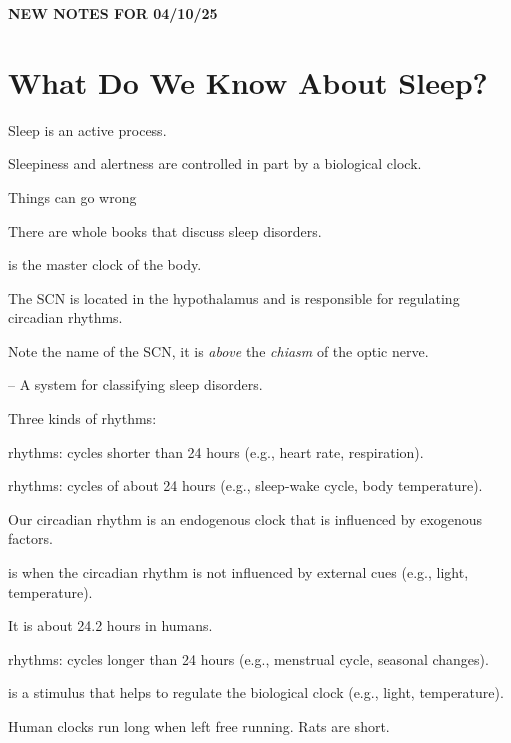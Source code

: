 \begin{center}
    \textbf{NEW NOTES FOR 04/10/25} \\
    \hrulefill
\end{center}

\section{What Do We Know About Sleep?}

\begin{coloredlist}
    \item Sleep is an active process.
    \item Sleepiness and alertness are controlled in part by a biological clock.
    \item Things can go wrong
    \begin{coloredlist}
        \item There are whole books that discuss sleep disorders.
    \end{coloredlist}
    \item {} is the master clock of the body.
    \begin{coloredlist}
        \item The SCN is located in the hypothalamus and is responsible for regulating circadian rhythms.
        \item Note the name of the SCN, it is \textit{above} the \textit{chiasm} of the optic nerve.
    \end{coloredlist}
    \item {} -- A system for classifying sleep disorders.
    \item Three kinds of rhythms:
    \begin{coloredlist}
        \item {} rhythms: cycles shorter than 24 hours (e.g., heart rate, respiration).
        \item {} rhythms: cycles of about 24 hours (e.g., sleep-wake cycle, body temperature).
        \begin{coloredlist}
            \item Our circadian rhythm is an endogenous clock that is influenced by exogenous factors.
            \item {} is when the circadian rhythm is not influenced by external cues (e.g., light, temperature).
            \item It is about 24.2 hours in humans.
        \end{coloredlist}
        \item {} rhythms: cycles longer than 24 hours (e.g., menstrual cycle, seasonal changes).
    \end{coloredlist}
    \item {} is a stimulus that helps to regulate the biological clock (e.g., light, temperature).
    \item Human clocks run long when left free running. Rats are short.
\end{coloredlist}

